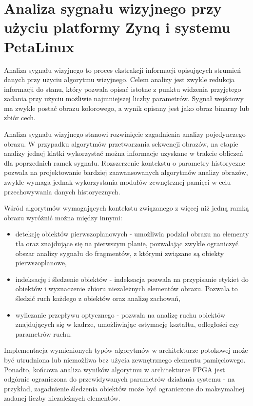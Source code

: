 \chapter{Analiza sygnału wizyjnego przy użyciu platformy Zynq i systemu PetaLinux}
\label{chap:projekt}



Analiza sygnału wizyjnego to proces ekstrakcji informacji opisujących strumień danych przy użyciu algorytmu wizyjnego. Celem analizy jest zwykle redukcja informacji do stanu, który pozwala opisać istotne z punktu widzenia przyjętego zadania przy użyciu możliwie najmniejszej liczby parametrów. Sygnał wejściowy ma zwykle postać obrazu kolorowego, a wynik opisany jest jako obraz binarny lub zbiór cech.

Analiza sygnału wizyjnego stanowi rozwinięcie zagadnienia analizy pojedynczego obrazu. W przypadku algorytmów przetwarzania sekwencji obrazów, na etapie analizy jednej klatki wykorzystać można informacje uzyskane w trakcie obliczeń dla poprzednich ramek sygnału. Rozszerzenie kontekstu o parametry historyczne pozwala na projektowanie bardziej zaawansowanych algorytmów analizy obrazów, zwykle wymaga jednak wykorzystania modułów zewnętrznej pamięci w celu przechowywania danych historycznych.

Wśród algorytmów wymagających kontekstu związanego z więcej niż jedną ramką obrazu wyróżnić można między innymi:
\begin{itemize}
	\item detekcję obiektów pierwszoplanowych - umożliwia podział obrazu na elementy tła oraz znajdujące się na pierwszym planie, pozwalając zwykle ograniczyć obszar analizy sygnału do fragmentów, z którymi związane są obiekty pierwszoplanowe,

	\item indeksację i śledzenie obiektów - indeksacja pozwala na przypisanie etykiet do obiektów i wyznaczenie zbioru niezależnych elementów obrazu. Pozwala to śledzić ruch każdego z obiektów oraz analizę zachowań,
	
	\item wyliczanie przepływu optycznego - pozwala na analizę ruchu obiektów znajdujących się w kadrze, umożliwiając estymację kształtu, odległości czy parametrów ruchu.
\end{itemize}

Implementacja wymienionych typów algorytmów w architekturze potokowej może być utrudniona lub niemożliwa bez użycia zewnętrznego elementu pamięciowego. Ponadto, końcowa analiza wyników algorytmu w architekturze FPGA jest odgórnie ograniczona do przewidywanych parametrów działania systemu - na przykład, zagadnienie śledzenia obiektów może być ograniczone do maksymalnej zadanej liczby niezależnych elementów.

